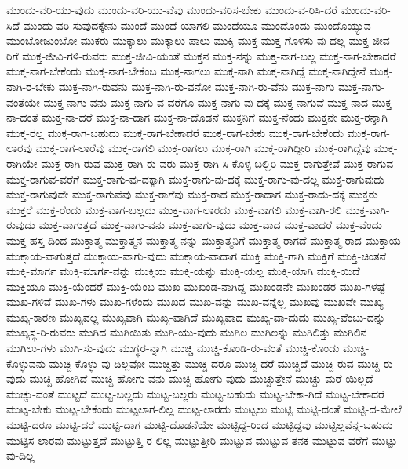 {ಮುಂದು-ವರಿ-ಯು-ವುದು
ಮುಂದು-ವರಿ-ಯು-ವೆವು
ಮುಂದು-ವರಿಸ-ಬೇಕು
ಮುಂದು-ವ-ರಿಸಿ-ದರೆ
ಮುಂದು-ವರಿ-ಸಿದೆ
ಮುಂದು-ವರಿ-ಸುವುದಕ್ಕೇನು
ಮುಂದೆ
ಮುಂದೆ-ಯಾಗಲಿ
ಮುಂದೆಯೂ
ಮುಂದೊಂದು
ಮುಂದೊಯ್ಯುವ
ಮುಂಬೋಜುಂಬೋ
ಮುಕರು
ಮುಕ್ಕಾಲು
ಮುಕ್ಕಾಲು-ಪಾಲು
ಮುಕ್ಕಿ
ಮುಕ್ತ
ಮುಕ್ತ-ಗೊಳಿಸು-ವು-ದಲ್ಲ
ಮುಕ್ತ-ಜೀವ-ರಿಗೆ
ಮುಕ್ತ-ಜೀವಿ-ಗಳಿ-ರುವರು
ಮುಕ್ತ-ಜೀವಿ-ಯಂತೆ
ಮುಕ್ತನ
ಮುಕ್ತ-ನನ್ನು
ಮುಕ್ತ-ನಾಗ-ಬಲ್ಲ
ಮುಕ್ತ-ನಾಗ-ಬೇಕಾದರೆ
ಮುಕ್ತ-ನಾಗ-ಬೇಕೆಂದು
ಮುಕ್ತ-ನಾಗ-ಬೇಕೆಂಬ
ಮುಕ್ತ-ನಾಗಲು
ಮುಕ್ತ-ನಾಗಿ
ಮುಕ್ತ-ನಾಗಿದ್ದೆ
ಮುಕ್ತ-ನಾಗಿದ್ದೇನೆ
ಮುಕ್ತ-ನಾಗಿ-ರ-ಬೇಕು
ಮುಕ್ತ-ನಾಗಿ-ರುವನು
ಮುಕ್ತ-ನಾಗಿ-ರು-ವನೋ
ಮುಕ್ತ-ನಾಗಿ-ರು-ವೆನು
ಮುಕ್ತ-ನಾಗು
ಮುಕ್ತ-ನಾಗು-ವಂತೆಯೇ
ಮುಕ್ತ-ನಾಗು-ವನು
ಮುಕ್ತ-ನಾಗು-ವ-ವರೆಗೂ
ಮುಕ್ತ-ನಾಗು-ವು-ದಕ್ಕೆ
ಮುಕ್ತ-ನಾಗುವೆ
ಮುಕ್ತ-ನಾದ
ಮುಕ್ತ-ನಾ-ದಂತೆ
ಮುಕ್ತ-ನಾ-ದರೆ
ಮುಕ್ತ-ನಾ-ದಾಗ
ಮುಕ್ತ-ನಾ-ದೊಡನೆ
ಮುಕ್ತನಿಗೆ
ಮುಕ್ತ-ನೆಂದು
ಮುಕ್ತನೇ
ಮುಕ್ತ-ರನ್ನಾಗಿ
ಮುಕ್ತ-ರಲ್ಲ
ಮುಕ್ತ-ರಾಗ-ಬಹುದು
ಮುಕ್ತ-ರಾಗ-ಬೇಕಾದರೆ
ಮುಕ್ತ-ರಾಗ-ಬೇಕು
ಮುಕ್ತ-ರಾಗ-ಬೇಕೆಂದು
ಮುಕ್ತ-ರಾಗ-ಲಾರವು
ಮುಕ್ತ-ರಾಗ-ಲಾರೆವು
ಮುಕ್ತ-ರಾಗಲಿ
ಮುಕ್ತ-ರಾಗಲು
ಮುಕ್ತ-ರಾಗಿ
ಮುಕ್ತ-ರಾಗಿದ್ದೀರಿ
ಮುಕ್ತ-ರಾಗಿದ್ದೆವು
ಮುಕ್ತ-ರಾಗಿಯೇ
ಮುಕ್ತ-ರಾಗಿ-ರುವ
ಮುಕ್ತ-ರಾಗಿ-ರು-ವರು
ಮುಕ್ತ-ರಾಗಿ-ಸಿ-ಕೊಳ್ಳ-ಬಲ್ಲಿರಿ
ಮುಕ್ತ-ರಾಗುತ್ತೇವೆ
ಮುಕ್ತ-ರಾಗುವ
ಮುಕ್ತ-ರಾಗುವ-ವರೆಗೆ
ಮುಕ್ತ-ರಾಗು-ವು-ದಕ್ಕಾಗಿ
ಮುಕ್ತ-ರಾಗು-ವು-ದಕ್ಕೆ
ಮುಕ್ತ-ರಾಗು-ವು-ದಲ್ಲ
ಮುಕ್ತ-ರಾಗುವುದು
ಮುಕ್ತ-ರಾಗುವುದೇ
ಮುಕ್ತ-ರಾಗುವೆವು
ಮುಕ್ತ-ರಾಗೆವು
ಮುಕ್ತ-ರಾದ
ಮುಕ್ತ-ರಾದಾಗ
ಮುಕ್ತ-ರಾದು-ದಕ್ಕೆ
ಮುಕ್ತರು
ಮುಕ್ತರೆ
ಮುಕ್ತ-ರೆಂದು
ಮುಕ್ತ-ವಾಗ-ಬಲ್ಲದು
ಮುಕ್ತ-ವಾಗ-ಲಾರದು
ಮುಕ್ತ-ವಾಗಲಿ
ಮುಕ್ತ-ವಾಗಿ-ರಲಿ
ಮುಕ್ತ-ವಾಗಿ-ರುವುದು
ಮುಕ್ತ-ವಾಗುತ್ತದೆ
ಮುಕ್ತ-ವಾಗು-ವನು
ಮುಕ್ತ-ವಾಗು-ವುದು
ಮುಕ್ತ-ವಾದ
ಮುಕ್ತ-ವಾದರೆ
ಮುಕ್ತ-ವೆಂದು
ಮುಕ್ತ-ಹಸ್ತ-ದಿಂದ
ಮುಕ್ತಾತ್ಮ
ಮುಕ್ತಾತ್ಮನ
ಮುಕ್ತಾತ್ಮ-ನನ್ನು
ಮುಕ್ತಾತ್ಮನಿಗೆ
ಮುಕ್ತಾತ್ಮ-ರಾಗದೆ
ಮುಕ್ತಾತ್ಮ-ರಾದ
ಮುಕ್ತಾಯ
ಮುಕ್ತಾಯ-ವಾಗುತ್ತದೆ
ಮುಕ್ತಾಯ-ವಾಗು-ವುದು
ಮುಕ್ತಾಯ-ವಾದಾಗ
ಮುಕ್ತಿ
ಮುಕ್ತಿ-ಗಾಗಿ
ಮುಕ್ತಿಗೆ
ಮುಕ್ತಿ-ಚಿಂತನೆ
ಮುಕ್ತಿ-ಮಾರ್ಗ
ಮುಕ್ತಿ-ಮಾರ್ಗ-ವನ್ನು
ಮುಕ್ತಿಯ
ಮುಕ್ತಿ-ಯನ್ನು
ಮುಕ್ತಿ-ಯಲ್ಲ
ಮುಕ್ತಿ-ಯಾಗಿ
ಮುಕ್ತಿ-ಯಿದೆ
ಮುಕ್ತಿಯೂ
ಮುಕ್ತಿ-ಯೆಂದರೆ
ಮುಕ್ತಿ-ಯೆಂಬ
ಮುಖ
ಮುಖಂಡ-ನಾಗಿದ್ದ
ಮುಖಂಡನೇ
ಮುಖಂಡರ
ಮುಖ-ಗಳಷ್ಟೆ
ಮುಖ-ಗಳಿವೆ
ಮುಖ-ಗಳು
ಮುಖ-ಗಳೆಂದು
ಮುಖದ
ಮುಖ-ವನ್ನು
ಮುಖ-ವನ್ನೆಲ್ಲ
ಮುಖವು
ಮುಖವೇ
ಮುಖ್ಯ
ಮುಖ್ಯ-ಕಾರಣ
ಮುಖ್ಯವಲ್ಲ
ಮುಖ್ಯವಾಗಿ
ಮುಖ್ಯ-ವಾಗಿದೆ
ಮುಖ್ಯವಾದ
ಮುಖ್ಯ-ವಾ-ದುದು
ಮುಖ್ಯ-ವೆಂಬು-ದನ್ನು
ಮುಖ್ಯಸ್ಥ-ರಿ-ರುವರು
ಮುಗಿದ
ಮುಗಿಯಿತು
ಮುಗಿ-ಯು-ವುದು
ಮುಗಿಲ
ಮುಗಿಲನ್ನು
ಮುಗಿಲಿತ್ತು
ಮುಗಿಲಿನ
ಮುಗಿಲು-ಗಳು
ಮುಗಿ-ಸು-ವುದು
ಮುಗ್ಧರ-ನ್ನಾಗಿ
ಮುಚ್ಚಿ
ಮುಚ್ಚಿ-ಕೊಂಡಿ-ರು-ವಂತೆ
ಮುಚ್ಚಿ-ಕೊಂಡು
ಮುಚ್ಚಿ-ಕೊಳ್ಳುವನು
ಮುಚ್ಚಿ-ಕೊಳ್ಳು-ವು-ದಿಲ್ಲವೋ
ಮುಚ್ಚಿತ್ತು
ಮುಚ್ಚಿ-ದರೂ
ಮುಚ್ಚಿ-ದರೆ
ಮುಚ್ಚಿದೆ
ಮುಚ್ಚಿ-ರುವ
ಮುಚ್ಚಿ-ರು-ವುದು
ಮುಚ್ಚಿ-ಹೋಗಿದೆ
ಮುಚ್ಚಿ-ಹೋಗು-ವನು
ಮುಚ್ಚಿ-ಹೋಗು-ವುದು
ಮುಚ್ಚುತ್ತೇನೆ
ಮುಚ್ಚು-ಮರೆ-ಯಿಲ್ಲದೆ
ಮುಚ್ಚು-ವಂತೆ
ಮುಟ್ಟದೆ
ಮುಟ್ಟ-ಬಲ್ಲದು
ಮುಟ್ಟ-ಬಲ್ಲರು
ಮುಟ್ಟ-ಬಹುದು
ಮುಟ್ಟ-ಬೇಕಾ-ಗಿದೆ
ಮುಟ್ಟ-ಬೇಕಾದರೆ
ಮುಟ್ಟ-ಬೇಕು
ಮುಟ್ಟ-ಬೇಕೆಂದು
ಮುಟ್ಟಲಾಗ-ಲಿಲ್ಲ
ಮುಟ್ಟ-ಲಾರದು
ಮುಟ್ಟಲು
ಮುಟ್ಟಿ
ಮುಟ್ಟಿ-ದಂತೆ
ಮುಟ್ಟಿ-ದ-ಮೇಲೆ
ಮುಟ್ಟಿ-ದರೂ
ಮುಟ್ಟಿ-ದರೆ
ಮುಟ್ಟಿ-ದಾಗ
ಮುಟ್ಟಿ-ದೊಡನೆಯೇ
ಮುಟ್ಟಿದ್ದ-ರಿಂದ
ಮುಟ್ಟಿದ್ದವು
ಮುಟ್ಟಿಲ್ಲವೆನ್ನ-ಬಹುದು
ಮುಟ್ಟಿಸ-ಲಾರವು
ಮುಟ್ಟುತ್ತದೆ
ಮುಟ್ಟುತ್ತಿ-ರ-ಲಿಲ್ಲ
ಮುಟ್ಟುತ್ತೀರಿ
ಮುಟ್ಟುವ
ಮುಟ್ಟುವ-ತನಕ
ಮುಟ್ಟುವ-ವರೆಗೆ
ಮುಟ್ಟು-ವು-ದಿಲ್ಲ
}
